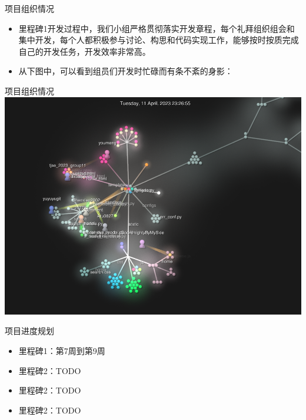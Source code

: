 \begin{frame}{项目组织情况}
    \begin{itemize}
        \item 里程碑1开发过程中，我们小组严格贯彻落实开发章程，每个礼拜组织组会和集中开发，每个人都积极参与讨论、构思和代码实现工作，能够按时按质完成自己的开发任务，开发效率非常高。
        \item 从下图中，可以看到组员们开发时忙碌而有条不紊的身影：
    \end{itemize}
\end{frame}

\begin{frame}{项目组织情况}
    \includegraphics[width=1\textwidth]{contents/figure/commits.png}
\end{frame}

\begin{frame}{项目进度规划}
    \begin{itemize}
        \item 里程碑1：第7周到第9周
        \item 里程碑2：TODO
        \item 里程碑2：TODO
        \item 里程碑2：TODO
    \end{itemize}
\end{frame}